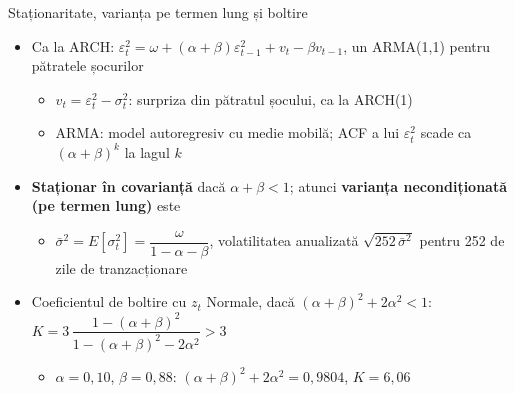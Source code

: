 \begin{frame}{Staționaritate, varianța pe termen lung și boltire}
\itemsize{\small}
\begin{itemize}
    \item Ca la ARCH: $\varepsilon_t^2 = \omega + (\alpha + \beta)\varepsilon_{t-1}^2 + v_t - \beta v_{t-1}$, un ARMA(1,1) pentru pătratele șocurilor
    \begin{itemize}
        \item $v_t = \varepsilon_t^2 - \sigma_t^2$: surpriza din pătratul șocului, ca la ARCH(1)
        \item ARMA: model autoregresiv cu medie mobilă; ACF a lui $\varepsilon_t^2$ scade ca $(\alpha + \beta)^k$ la lagul $k$
    \end{itemize}
    \item \textbf{Staționar în covarianță} dacă $\alpha + \beta < 1$; atunci \textbf{varianța necondiționată (pe termen lung)} este
    \begin{itemize}
        \item $\bar\sigma^2 = E[\sigma_t^2] = \dfrac{\omega}{1 - \alpha - \beta}$, \quad volatilitatea anualizată $\sqrt{252\,\bar\sigma^2}$ pentru 252 de zile de tranzacționare
    \end{itemize}
    \item Coeficientul de boltire cu $z_t$ Normale, dacă $(\alpha + \beta)^2 + 2\alpha^2 < 1$: $K = 3\,\dfrac{1 - (\alpha + \beta)^2}{1 - (\alpha + \beta)^2 - 2\alpha^2} > 3$
    \begin{itemize}
        \item $\alpha = 0{,}10$, $\beta = 0{,}88$: $(\alpha + \beta)^2 + 2\alpha^2 = 0{,}9804$, $K = 6{,}06$
    \end{itemize}
\end{itemize}
\end{frame}

